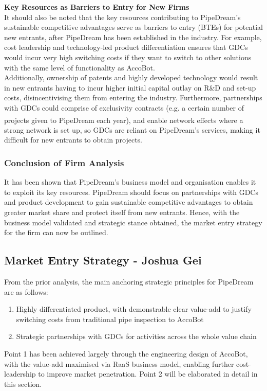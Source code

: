 \documentclass[11pt]{article}		%
\newcommand{\supercite}[1]{\textsuperscript{\cite{#1}}}		%
\begin{document}
	\textbf{Key Resources as Barriers to Entry for New Firms}
	\\It should also be noted that the key resources contributing to PipeDream's sustainable competitive advantages serve as barriers to entry (BTEs) for potential new entrants, after PipeDream has been established in the industry. For example, cost leadership and technology-led product differentiation ensures that GDCs would incur very high switching costs if they want to switch to other solutions with the same level of functionality as AccoBot. 
	\\ \hspace*{2ex}Additionally, ownership of patents and highly developed technology would result in new entrants having to incur higher initial capital outlay on R\&D and set-up costs, disincentivising them from entering the industry. Furthermore, partnerships with GDCs could comprise of exclusivity contracts (e.g. a certain number of projects given to PipeDream each year), and enable network effects\supercite{networkeffect} where a strong network is set up, so GDCs are reliant on PipeDream's services, making it difficult for new entrants to obtain projects.
	
	\subsubsection{Conclusion of Firm Analysis}
	It has been shown that PipeDream's business model and organisation enables it to exploit its key resources. PipeDream should focus on partnerships with GDCs and product development to gain sustainable competitive advantages to obtain greater market share and protect itself from new entrants. Hence, with the business model validated and strategic stance obtained, the market entry strategy for the firm can now be outlined.
    
    \subsection[Market Entry Strategy]{Market Entry Strategy - Joshua Gei} \label{marketEntry}
    
    From the prior analysis, the main anchoring strategic principles for PipeDream are as follows: 
        \begin{enumerate}
        \item Highly differentiated product, with demonstrable clear value-add to justify switching costs from traditional pipe inspection to AccoBot
        \item Strategic partnerships with GDCs for activities across the whole value chain
        \end{enumerate}
    Point 1 has been achieved largely through the engineering design of AccoBot, with the value-add maximised via RaaS business model, enabling further cost-leadership to improve market penetration. Point 2 will be elaborated in detail in this section.  
    
\end{document}
